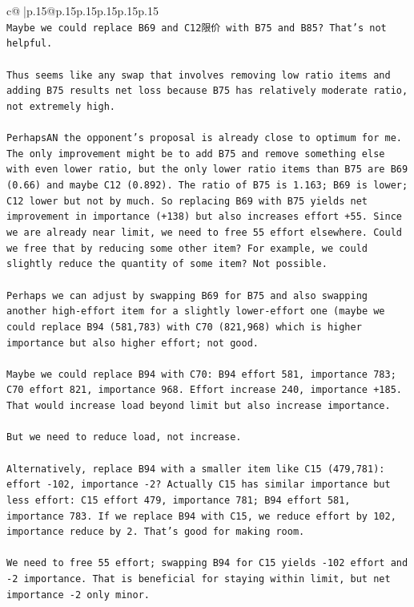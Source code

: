 \documentclass{article}
\begin{document}
{\begin{supertabular}{c@{$\;$}|p{.15\linewidth}@{}p{.15\linewidth}p{.15\linewidth}p{.15\linewidth}p{.15\linewidth}p{.15\linewidth}}
{{{\\ 
\texttt{Maybe we could replace B69 and C12限价 with B75 and B85? That's not helpful.} \\
\\ 
\texttt{Thus seems like any swap that involves removing low ratio items and adding B75 results net loss because B75 has relatively moderate ratio, not extremely high.} \\
\\ 
\texttt{PerhapsAN the opponent's proposal is already close to optimum for me. The only improvement might be to add B75 and remove something else with even lower ratio, but the only lower ratio items than B75 are B69 (0.66) and maybe C12 (0.892). The ratio of B75 is 1.163; B69 is lower; C12 lower but not by much. So replacing B69 with B75 yields net improvement in importance (+138) but also increases effort +55. Since we are already near limit, we need to free 55 effort elsewhere. Could we free that by reducing some other item? For example, we could slightly reduce the quantity of some item? Not possible.} \\
\\ 
\texttt{Perhaps we can adjust by swapping B69 for B75 and also swapping another high{-}effort item for a slightly lower{-}effort one (maybe we could replace B94 (581,783) with C70 (821,968) which is higher importance but also higher effort; not good.} \\
\\ 
\texttt{Maybe we could replace B94 with C70: B94 effort 581, importance 783; C70 effort 821, importance 968. Effort increase 240, importance +185. That would increase load beyond limit but also increase importance.} \\
\\ 
\texttt{But we need to reduce load, not increase.} \\
\\ 
\texttt{Alternatively, replace B94 with a smaller item like C15 (479,781): effort {-}102, importance {-}2? Actually C15 has similar importance but less effort: C15 effort 479, importance 781; B94 effort 581, importance 783. If we replace B94 with C15, we reduce effort by 102, importance reduce by 2. That's good for making room.} \\
\\ 
\texttt{We need to free 55 effort; swapping B94 for C15 yields {-}102 effort and {-}2 importance. That is beneficial for staying within limit, but net importance {-}2 only minor.} \\
\\ 
}}}
\end{supertabular}}
\end{document}
